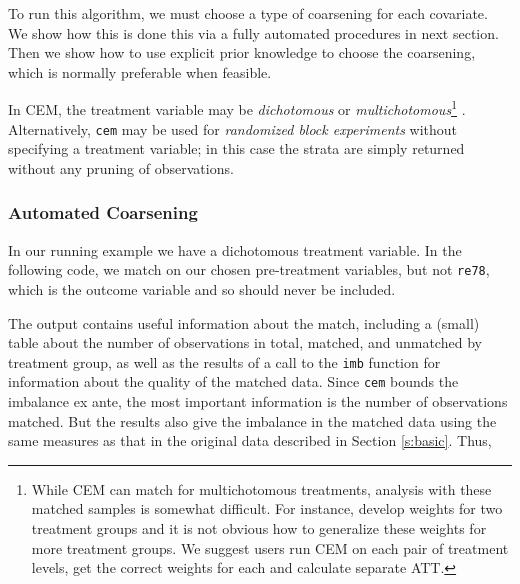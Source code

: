 \documentclass[11pt]{article}
\begin{document}
To run this algorithm, we must choose a type of coarsening for each
covariate.  We show how this is done this via a fully automated procedures
in next section.  Then we show how to use explicit prior knowledge to
choose the coarsening, which is normally preferable when feasible.

In CEM, the treatment variable may be \emph{dichotomous} or
\emph{multichotomous}\footnote{ While CEM can match for multichotomous
  treatments, analysis with these matched samples is somewhat difficult.
  For instance, \citet{IacKinPor11c} develop weights for two treatment
  groups and it is not obvious how to generalize these weights for more
  treatment groups. We suggest users run CEM on each pair of treatment
  levels, get the correct weights for each and calculate separate ATT.} .
Alternatively, \texttt{cem} may be used for \emph{randomized block
  experiments} without specifying a treatment variable; in this case the
strata are simply returned without any pruning of observations.

\subsubsection{Automated Coarsening}\label{s:cem-auto}

In our running example we have a dichotomous treatment variable.  In the
following code, we match on our chosen pre-treatment variables, but not
\texttt{re78}, which is the outcome variable and so should never be
included.

The output contains useful information about the match, including a
(small) table about the number of observations in total, matched, and
unmatched by treatment group, as well as the results of a call to the
\texttt{imb} function for information about the quality of the
matched data. Since \texttt{cem} bounds the imbalance ex ante, the most
important information is the number of observations matched.  But the
results also give the imbalance in the matched data using the same
measures as that in the original data described in Section \ref{s:basic}.
Thus,
\end{document}
